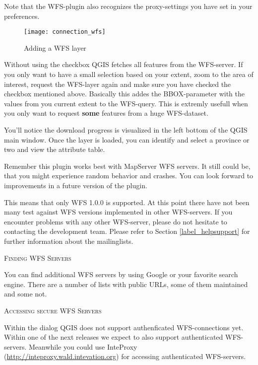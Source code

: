 Note that the WFS-plugin also recognizes the proxy-settings you have set
in your preferences.

\begin{figure}[ht]
  \centering
  	\texttt{[image: connection\_wfs]}
  	\caption{Adding a WFS layer \nixcaption}\label{fig:wfs_dmsolutions}
\end{figure}

Without using the checkbox  QGIS fetches all features from the WFS-server. If you
only want to have a small selection based on your extent, zoom to the area
of interest, request the WFS-layer again and make sure you have checked
the checkbox mentioned above. Basically this addes the BBOX-parameter with
the values from you current extent to the WFS-query. This is extremly
usefull when you only want to request \textbf{some} features from a huge
WFS-dataset.

You'll notice the download progress is visualized in the left bottom of the 
QGIS main window. Once the layer is loaded, you can identify and select a 
province or two and view the attribute table.

Remember this plugin works best with MapServer WFS servers. It still
could be, that you might experience random behavior
and crashes. You can look forward to improvements in a future version of the plugin.

This means that only WFS 1.0.0 is supported. At this point there have not
been many test against WFS versions implemented in other WFS-servers.
If you encounter problems with any other WFS-server, please do not
hesitate to contacting the development team. Please refer to Section
\ref{label_helpsupport} for further information about the mailinglists.

\begin{Tip}[htb]\caption{\textsc{Finding WFS Servers}}
You can find additional WFS servers by using Google or your
favorite search engine. There are a number of lists with public URLs, some
of them maintained and some not.
\end{Tip}

\begin{Tip}[htb]\caption{\textsc{Accessing secure WFS Servers}}
Within the dialog  QGIS does not support
authenficated WFS-connections yet. Within one of the next releases we expect
to also support authenticated WFS-servers. Meanwhile you could use InteProxy
(\url{http://inteproxy.wald.intevation.org}) for accessing authenticated
WFS-servers.
\end{Tip}

\FloatBarrier
